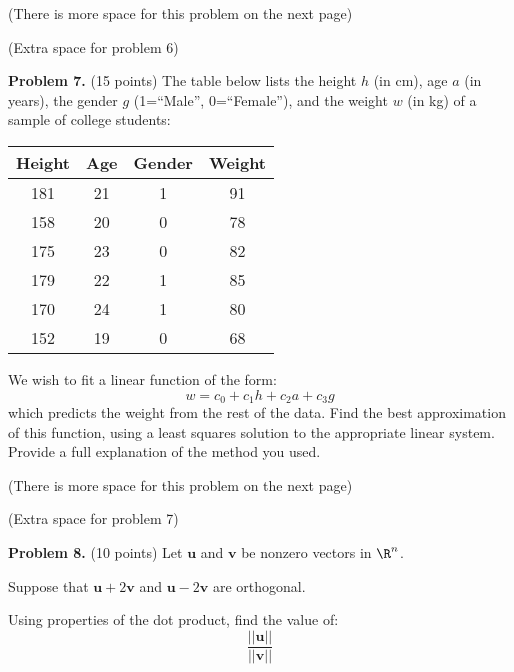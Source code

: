\documentclass[12pt]{article}
\begin{document}
\vfill

(There is more space for this problem on the next page)

\clearpage

(Extra space for problem 6)

\clearpage

\textbf{Problem 7.} (15 points) The table below lists the height $h$ (in cm), age $a$ (in years), the gender $g$ (1=``Male'', 0=``Female''), and the weight $w$ (in kg) of a sample of college students:

\begin{center}
\begin{tabular}{c|c|c|c}
Height & Age & Gender & Weight\\\hline
181 & 21 & 1 & 91\\
158 & 20 & 0 & 78\\
175 & 23 & 0 & 82\\
179 & 22 & 1 & 85\\
170 & 24 & 1 & 80\\
152 & 19 & 0 & 68\\
\end{tabular}
\end{center}

We wish to fit a linear function of the form:
\[
w=c_0+c_1h+c_2a+c_3g
\]
which predicts the weight from the rest of the data. Find the best approximation of this function, using a least squares solution to the appropriate linear system. Provide a full explanation of the method you used.

\vfill

(There is more space for this problem on the next page)

\clearpage

(Extra space for problem 7)

\clearpage

\textbf{Problem 8.} (10 points) Let $\mathbf{u}$ and $\mathbf{v}$ be nonzero vectors in $\R^n$.

Suppose that $\mathbf{u}+2\mathbf{v}$ and $\mathbf{u}-2\mathbf{v}$ are orthogonal.

Using properties of the dot product, find the value of:
\[
\frac{||\mathbf{u}||}{||\mathbf{v}||}
\]
\end{document}
